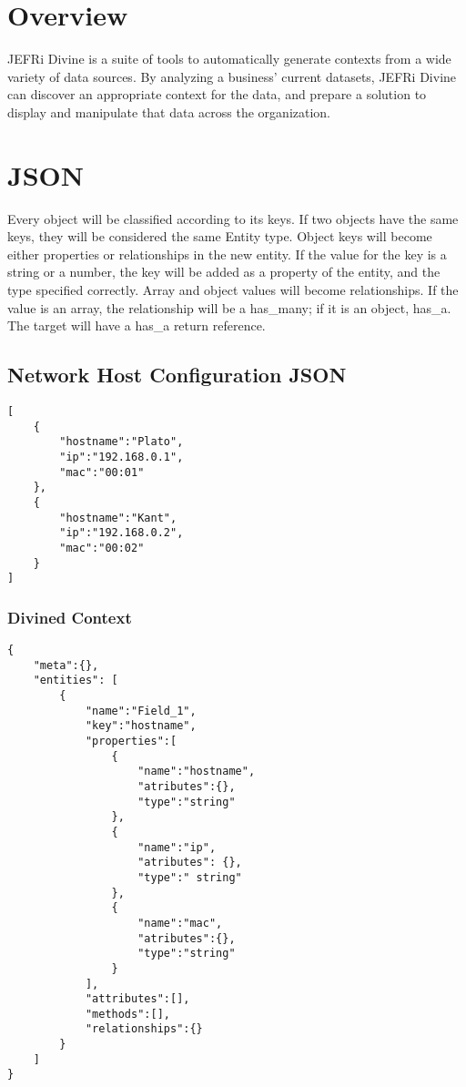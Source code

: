 \documentclass{article}
\begin{document}

\tableofcontents
\newpage
\linespread{1.6}

\section{Overview}

JEFRi Divine is a suite of tools to automatically generate contexts from a
wide variety of data sources. By analyzing a business' current datasets, JEFRi
Divine can discover an appropriate context for the data, and prepare a
solution to display and manipulate that data across the organization.

\section{JSON}

Every object will be classified according to its keys. If two objects have the
same keys, they will be considered the same Entity type. Object keys will
become either properties or relationships in the new entity. If the value for
the key is a string or a number, the key will be added as a property of the
entity, and the type specified correctly. Array and object values will become
relationships. If the value is an array, the relationship will be a {\ilcode
has\_many}; if it is an object, {\ilcode has\_a}. The target will have a
{\ilcode has\_a} return reference.

\subsection{Network Host Configuration JSON}
\begin{lstlisting}
[
	{
		"hostname":"Plato",
		"ip":"192.168.0.1",
		"mac":"00:01"
	},
	{
		"hostname":"Kant",
		"ip":"192.168.0.2",
		"mac":"00:02"
	}
]
\end{lstlisting}

\subsubsection{Divined Context}
\begin{lstlisting}
{
	"meta":{},
	"entities": [
		{
			"name":"Field_1",
			"key":"hostname",
			"properties":[
				{
					"name":"hostname",
					"atributes":{},
					"type":"string"
				},
				{
					"name":"ip",
					"atributes": {},
					"type":" string"
				},
				{
					"name":"mac",
					"atributes":{},
					"type":"string"
				}
			],
			"attributes":[],
			"methods":[],
			"relationships":{}
		}
	]
}
\end{lstlisting}
\end{document}

